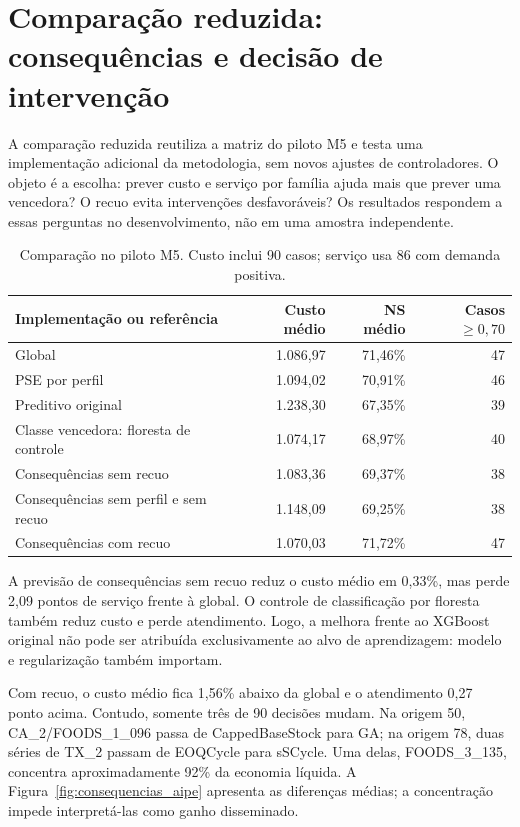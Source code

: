 \section{Comparação reduzida: consequências e decisão de intervenção}
\label{sec:comparacao_consequencias}
A comparação reduzida reutiliza a matriz do piloto M5 e testa uma implementação adicional da metodologia, sem novos ajustes de controladores. O objeto é a escolha: prever custo e serviço por família ajuda mais que prever uma vencedora? O recuo evita intervenções desfavoráveis? Os resultados respondem a essas perguntas no desenvolvimento, não em uma amostra independente.

\begin{table}[htbp]\centering\small
\caption{Comparação no piloto M5. Custo inclui 90 casos; serviço usa 86 com demanda positiva.}\label{tab:consequencias_aipe}
\begin{tabular}{@{}p{5.6cm}rrr@{}}\toprule
Implementação ou referência & Custo médio & NS médio & Casos $\geq0{,}70$\\\midrule
Global & 1.086,97 & 71,46\% & 47\\
PSE por perfil & 1.094,02 & 70,91\% & 46\\
Preditivo original & 1.238,30 & 67,35\% & 39\\
Classe vencedora: floresta de controle & 1.074,17 & 68,97\% & 40\\
Consequências sem recuo & 1.083,36 & 69,37\% & 38\\
Consequências sem perfil e sem recuo & 1.148,09 & 69,25\% & 38\\
Consequências com recuo & 1.070,03 & 71,72\% & 47\\\bottomrule
\end{tabular}\end{table}

A previsão de consequências sem recuo reduz o custo médio em 0,33\%, mas perde 2,09 pontos de serviço frente à global. O controle de classificação por floresta também reduz custo e perde atendimento. Logo, a melhora frente ao XGBoost original não pode ser atribuída exclusivamente ao alvo de aprendizagem: modelo e regularização também importam.

Com recuo, o custo médio fica 1,56\% abaixo da global e o atendimento 0,27 ponto acima. Contudo, somente três de 90 decisões mudam. Na origem 50, CA\_2/FOODS\_1\_096 passa de CappedBaseStock para GA; na origem 78, duas séries de TX\_2 passam de EOQCycle para sSCycle. Uma delas, FOODS\_3\_135, concentra aproximadamente 92\% da economia líquida. A Figura~\ref{fig:consequencias_aipe} apresenta as diferenças médias; a concentração impede interpretá-las como ganho disseminado.

